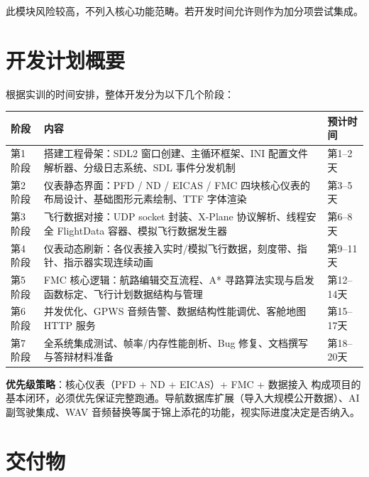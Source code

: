 \documentclass[12pt,a4paper]{ctexart}
\begin{document}
此模块风险较高，不列入核心功能范畴。若开发时间允许则作为加分项尝试集成。

\section{开发计划概要}


根据实训的时间安排，整体开发分为以下几个阶段：

\begin{table}[H]
\centering
\begin{tabular}{>{\centering\arraybackslash}p{1.5cm} >{\raggedright\arraybackslash}p{6.5cm} >{\centering\arraybackslash}p{5cm}}
\toprule
\textbf{阶段} & \textbf{内容} & \textbf{预计时间} \\
\midrule
第1阶段 & 搭建工程骨架：SDL2 窗口创建、主循环框架、INI 配置文件解析器、分级日志系统、SDL 事件分发机制 & 第1--2天 \\
\addlinespace
第2阶段 & 仪表静态界面：PFD / ND / EICAS / FMC 四块核心仪表的布局设计、基础图形元素绘制、TTF 字体渲染 & 第3--5天 \\
\addlinespace
第3阶段 & 飞行数据对接：UDP socket 封装、X-Plane 协议解析、线程安全 FlightData 容器、模拟飞行数据发生器 & 第6--8天 \\
\addlinespace
第4阶段 & 仪表动态刷新：各仪表接入实时/模拟飞行数据，刻度带、指针、指示器实现连续动画 & 第9--11天 \\
\addlinespace
第5阶段 & FMC 核心逻辑：航路编辑交互流程、A* 寻路算法实现与启发函数标定、飞行计划数据结构与管理 & 第12--14天 \\
\addlinespace
第6阶段 & 并发优化、GPWS 音频告警、数据结构性能调优、客舱地图 HTTP 服务 & 第15--17天 \\
\addlinespace
第7阶段 & 全系统集成测试、帧率/内存性能剖析、Bug 修复、文档撰写与答辩材料准备 & 第18--20天 \\
\bottomrule
\end{tabular}
\end{table}

\textbf{优先级策略}：核心仪表（PFD + ND + EICAS）+ FMC + 数据接入 构成项目的基本闭环，必须优先保证完整跑通。导航数据库扩展（导入大规模公开数据）、AI 副驾驶集成、WAV 音频替换等属于锦上添花的功能，视实际进度决定是否纳入。

\section{交付物}
\end{document}
